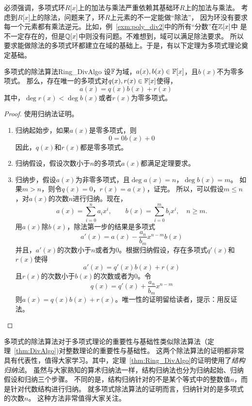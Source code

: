 \begin{example}
\label{exm:poly_div1}
\end{example}

\begin{example}
\label{exm:poly_div2}
\end{example}

必须强调，多项式环$R\lbrack x \rbrack$上的加法与乘法严重依赖其基础环$R$上的加法与乘法。
考虑到$R\lbrack x \rbrack$上的除法，问题来了，环$R$上元素的不一定能做“除法”，
因为环没有要求每一个元素都有乘法逆元。比如，例~\ref{exm:poly_div2}中的所有“分数”在${\mathbb Z}\lbrack x \rbrack$中
是不一定存在的，但是${\mathbb Q} \lbrack x \rbrack$中则没有问题。不难想到，域可以满足除法要求。
所以要求能做除法的多项式环都建立在域的基础上。于是，有以下定理为多项式理论奠定基础。

\begin{theorem}{多项式的除法算法}{Ring_DivAlgo}
设${\mathbb F}$为域，$a(x), b(x) \in {\mathbb F}\lbrack x \rbrack$，且$b(x)$不为零多项式。
那么，存在唯一的多项式对$q(x), r(x) \in {\mathbb F}\lbrack x \rbrack$使得， 
	\[a(x)  = q(x)b(x) + r(x)\]
其中，$\deg r(x) < \deg b(x)$或者$r(x)$为零多项式。
\end{theorem}

\begin{proof}
使用归纳法证明。
\begin{enumerate}
\item 归纳起始步，如果$a(x)$是零多项式，则
\[ 0 = 0 b(x) + 0\]
因此，$q(x)$和$r(x)$都是零多项式。

\item 归纳假设，假设次数小于$n$的多项式$a(x)$都满足定理要求。

\item 归纳步，假设$a(x)$为非零多项式，且$\deg a(x) = n$，$\deg b(x) = m$。
如果$m > n$，则令$q(x) = 0$，$r(x) = a(x)$，证完。
所以，可以假设$m \leq n$，对$a(x)$的次数$n$进行归纳。现在，
\[ a(x) = \sum_{i=0}^n a_i x^i , \qquad  b(x) = \sum_{i=0}^m b_i x^i, \quad n \geq m.\]
用$a(x)$除$b(x)$，除法第一步的结果是多项式
\[a'(x) =  a(x) - \frac{a_n}{b_m}x^{n-m} b(x)\]
并且，$a'(x)$的次数小于$n$或者为$0$。根据归纳假设，存在多项式$q'(x)$和$r(x)$使得
\[a'(x) =  q'(x)b(x) + r(x)\]
且$r(x)$的次数小于$b(x)$的次数或者为$0$。令
\[ q(x) = q'(x) + \frac{a_n}{b_m}x^{n-m} \]
则$a(x) = q(x)b(x) + r(x)$。唯一性的证明留给读者，提示：用反证法。
\end{enumerate}
\end{proof}

多项式的除法算法对于多项式理论的重要性与基础性类似除法算法（定理~\ref{thm:DivAlgo})对整数理论的重要性与基础性。
这两个除法算法的证明都非常具有代表性，值得大家学习。其中，定理~\ref{thm:Ring_DivAlgo}的证明使用了\emph{结构归纳法}。
虽然与大家熟知的算术归纳法一样，结构归纳法也分为归纳起始、归纳假设和归纳三个步骤。
不同的是，结构归纳针对的不是某个等式中的整数值$n$，而是针对代数结构进行归纳。
就多项式除法算法的证明而言，归纳针对的是多项式的次数$n$。
这种方法非常值得大家关注。

